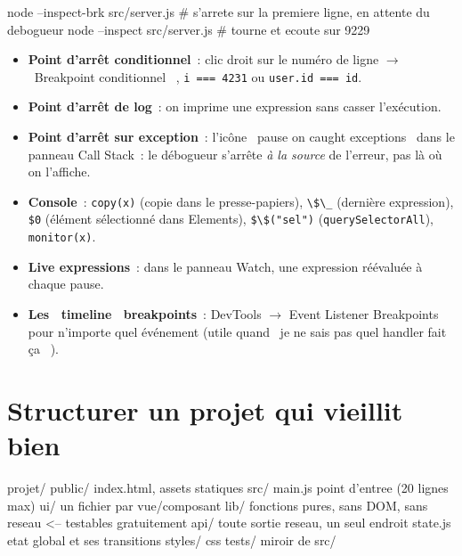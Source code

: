 \begin{terminal}
node --inspect-brk src/server.js        # s'arrete sur la premiere ligne, en attente du debogueur
node --inspect src/server.js            # tourne et ecoute sur 9229
\end{terminal}

\begin{itemize}
  \item \textbf{Point d'arr\^et conditionnel}~: clic droit sur le num\'ero de ligne $\rightarrow$ \og ~Breakpoint
        conditionnel~ \fg{}, \verb|i === 4231| ou \verb|user.id === id|.
  \item \textbf{Point d'arr\^et de log}~: on imprime une expression sans casser l'ex\'ecution.
  \item \textbf{Point d'arr\^et sur exception}~: l'ic\^one \og ~pause on caught exceptions~ \fg{} dans le panneau
        Call Stack~: le d\'ebogueur s'arr\^ete \emph{\`a la source} de l'erreur, pas l\`a o\`u on l'affiche.
  \item \textbf{Console}~: \verb|copy(x)| (copie dans le presse-papiers), \verb|\$\_| (derni\`ere
        expression), \verb|$0| (\'el\'ement s\'electionn\'e dans Elements), \verb|$\$("sel")| (\texttt{querySelectorAll}), \verb|monitor(x)|.
  \item \textbf{Live expressions}~: dans le panneau Watch, une expression r\'e\'evalu\'ee \`a chaque pause.
  \item \textbf{Les \og ~timeline~ \fg{} breakpoints}~: DevTools $\rightarrow$ Event Listener Breakpoints pour
        n'importe quel \'ev\'enement (utile quand \og ~je ne sais pas quel handler fait \c{c}a~ \fg{}).
\end{itemize}

\section{Structurer un projet qui vieillit bien}

\begin{codeplain}
projet/
  public/          index.html, assets statiques
  src/
    main.js        point d'entree (20 lignes max)
    ui/            un fichier par vue/composant
    lib/           fonctions pures, sans DOM, sans reseau  <-- testables gratuitement
    api/           toute sortie reseau, un seul endroit
    state.js       etat global et ses transitions
    styles/        css
  tests/           miroir de src/
\end{codeplain}

